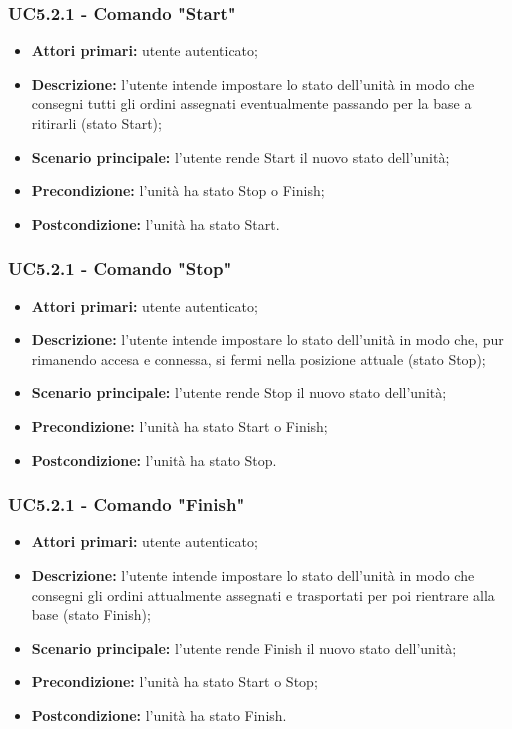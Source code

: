 \subsubsection{UC5.2.1 - Comando "Start"}
\begin{itemize}
    \item \textbf{Attori primari:} utente autenticato;
    \item \textbf{Descrizione:} l'utente intende impostare lo stato dell'unità in modo che consegni tutti gli ordini assegnati eventualmente passando per la base a ritirarli (stato Start);
    \item \textbf{Scenario principale:} l'utente rende Start il nuovo stato dell'unità;
    \item \textbf{Precondizione:} l'unità ha stato Stop o Finish;
    \item \textbf{Postcondizione:} l'unità ha stato Start.
\end{itemize}

\subsubsection{UC5.2.1 - Comando "Stop"}
\begin{itemize}
    \item \textbf{Attori primari:} utente autenticato;
    \item \textbf{Descrizione:} l'utente intende impostare lo stato dell'unità in modo che, pur rimanendo accesa e connessa, si fermi nella posizione attuale (stato Stop);
    \item \textbf{Scenario principale:} l'utente rende Stop il nuovo stato dell'unità;
    \item \textbf{Precondizione:} l'unità ha stato Start o Finish;
    \item \textbf{Postcondizione:} l'unità ha stato Stop.
\end{itemize}

\subsubsection{UC5.2.1 - Comando "Finish"}
\begin{itemize}
    \item \textbf{Attori primari:} utente autenticato;
    \item \textbf{Descrizione:} l'utente intende impostare lo stato dell'unità in modo che consegni gli ordini attualmente assegnati e trasportati per poi rientrare alla base (stato Finish);
    \item \textbf{Scenario principale:} l'utente rende Finish il nuovo stato dell'unità;
    \item \textbf{Precondizione:} l'unità ha stato Start o Stop;
    \item \textbf{Postcondizione:} l'unità ha stato Finish.
\end{itemize}

